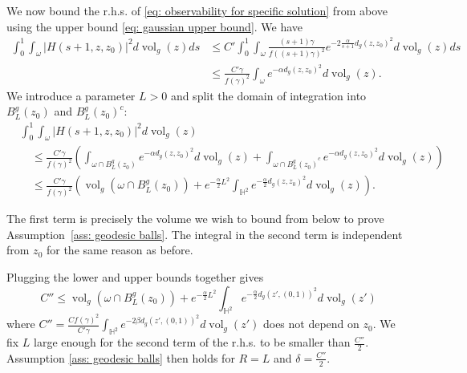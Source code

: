 \documentclass[letterpaper,11pt]{amsart}
\theoremstyle{note}
\numberwithin{equation}{section}
\DeclareMathOperator{\vol}{vol}
\begin{document}
We now bound the r.h.s. of \eqref{eq: observability for specific solution} from above using the upper bound \eqref{eq: gaussian upper bound}. We have $$\begin{aligned}
    \int_0^1 \int_\omega |H(s+1, z, z_0)|^2 d\vol_g(z) ds &\leq C' \int_0^1 \int_\omega \frac{(s+1)\gamma}{f((s+1)\gamma)^2} e^{-2\frac{\alpha}{s+1} d_g(z,z_0)^2} d\vol_g(z) ds \\
    &\leq\frac{C'\gamma}{f(\gamma)^2} \int_\omega e^{-\alpha d_g(z,z_0)^2} d\vol_g(z).
\end{aligned}$$ We introduce a parameter $L > 0$ and split the domain of integration into $B^g_L(z_0)$ and $B^g_L(z_0)^c$: $$\begin{aligned}
    &\int_0^1 \int_\omega |H(s+1, z, z_0)|^2 d\vol_g(z) \\
    &\quad \leq \frac{C'\gamma}{f(\gamma)^2} \left( \int_{\omega \cap B^g_L(z_0)} e^{-\alpha d_g(z,z_0)^2} d\vol_g(z) + \int_{\omega \cap {B^g_L(z_0)}^c} e^{-\alpha d_g(z,z_0)^2} d\vol_g(z) \right) \\
    &\quad \leq \frac{C' \gamma}{f(\gamma)^2} \left(\vol_g(\omega \cap B^g_L(z_0)) + e^{-\frac{\alpha}{2} L^2} \int_{\mathbb{H}^2} e^{-\frac{\alpha}{2} d_g(z,z_0)^2} d\vol_g(z)\right).
\end{aligned}$$

The first term is precisely the volume we wish to bound from below to prove Assumption~\ref{ass: geodesic balls}. The integral in the second term is independent from $z_0$ for the same reason as before.

Plugging the lower and upper bounds together gives \begin{equation}
    \label{eq: lower < upper}
    C'' \leq \vol_g(\omega \cap B^g_L(z_0)) + e^{-\frac{\alpha}{2}L^2} \int_{\mathbb{H}^2} e^{-\frac{\alpha}{2} d_g(z',(0,1))^2} d\vol_g(z')
\end{equation} where $C'' = \frac{Cf(\gamma)^2}{C'\gamma} \int_{\mathbb{H}^2} e^{-2\beta d_g(z',(0,1))^2} d\vol_g(z')$ does not depend on $z_0$. We fix $L$ large enough for the second term of the r.h.s. to be smaller than $\frac{C''}{2}$. Assumption \ref{ass: geodesic balls} then holds for $R = L$ and $\delta = \frac{C''}{2}$.
\end{document}
